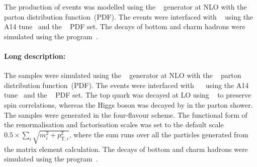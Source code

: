 The production of \tHq events was modelled using the \MGNLO[2.6.0]~\cite{Alwall:2014hca}
generator at NLO with the \NNPDF[3.0nlo]~\cite{Ball:2014uwa} parton distribution function~(PDF).
The events were interfaced with \PYTHIA[8.230]~\cite{Sjostrand:2014zea} using the A14 tune~\cite{ATL-PHYS-PUB-2014-021} and the
\NNPDF[2.3lo]~\cite{Ball:2014uwa} PDF set.
The decays of bottom and charm hadrons were simulated using the \EVTGEN[1.6.0] program~\cite{Lange:2001uf}. 

\paragraph{Long description:}

The \tHq samples were simulated using the \MGNLO[2.6.0]~\cite{Alwall:2014hca}
generator at NLO with the \NNPDF[3.0nlo]~\cite{Ball:2014uwa} parton distribution function~(PDF). The events were interfaced with
\PYTHIA[8.230]~\cite{Sjostrand:2014zea}~ using the A14 tune~\cite{ATL-PHYS-PUB-2014-021} and the \NNPDF[2.3lo]~\cite{Ball:2014uwa} PDF set. 
The top quark was decayed at LO using \MADSPIN~\cite{Frixione:2007zp,Artoisenet:2012st} to preserve spin correlations,
whereas the Higgs boson was decayed by \PYTHIA in the parton shower. The samples
were generated in the four-flavour scheme.
The functional form of the renormalisation and factorisation scales was set to the 
default scale $0.5\times \sum_i \sqrt{m^2_i+p^2_{\text{T},i}}$, where the sum runs over 
all the particles generated from the matrix element calculation.
The decays of bottom and charm hadrons were simulated using the \EVTGEN[1.6.0] program~\cite{Lange:2001uf}.
